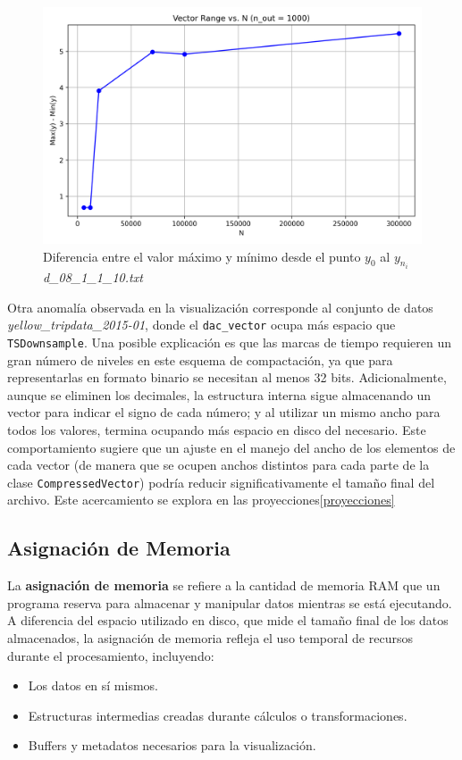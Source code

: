 \begin{figure}[H]
    \centering
    \includegraphics[width=0.8\linewidth]{anexo//exp//Comparison of Space Used//plots/range_acumulated.png}
    \caption[Rango de Valores Acumulado Para Dataset \textit{d\_08\_1\_1\_10.txt}]{Diferencia entre el valor máximo y mínimo desde el punto $y_0$ al $y_{n_i}$ \textit{d\_08\_1\_1\_10.txt}}
    \label{fig:range}
\end{figure}

Otra anomalía observada en la visualización corresponde al conjunto de datos \textit{yellow\_tripdata\_2015-01}, donde el \texttt{dac\_vector} ocupa más espacio que \texttt{TSDownsample}. Una posible explicación es que las marcas de tiempo requieren un gran número de niveles en este esquema de compactación, ya que para representarlas en formato binario se necesitan al menos 32 bits. Adicionalmente, aunque se eliminen los decimales, la estructura interna sigue almacenando un vector para indicar el signo de cada número; y al utilizar un mismo ancho para todos los valores, termina ocupando más espacio en disco del necesario. Este comportamiento sugiere que un ajuste en el manejo del ancho de los elementos de cada vector (de manera que se ocupen anchos distintos para cada parte de la clase \texttt{CompressedVector}) podría reducir significativamente el tamaño final del archivo. Este acercamiento se explora en las proyecciones\ref{proyecciones}


\newpage
\subsection{Asignación de Memoria}

La \textbf{asignación de memoria} se refiere a la cantidad de memoria RAM que un programa reserva para almacenar y manipular datos mientras se está ejecutando.  
A diferencia del espacio utilizado en disco, que mide el tamaño final de los datos almacenados, la asignación de memoria refleja el uso temporal de recursos durante el procesamiento, incluyendo:
\begin{itemize}
    \item Los datos en sí mismos.
    \item Estructuras intermedias creadas durante cálculos o transformaciones.
    \item Buffers y metadatos necesarios para la visualización.
\end{itemize}

